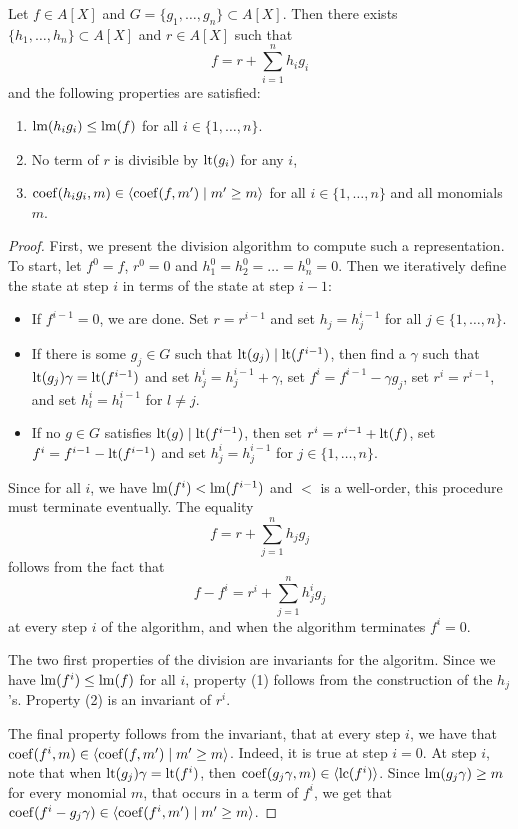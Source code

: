 \begin{theorem}
  Let $f \in A[X]$ and $G = \{g_{1}, \dots, g_{n}\} \subset A[X]$. Then there exists $\{h_{1}, \dots, h_{n}\} \subset A[X]$ and $r \in A[X]$ such that
  \[f = r + \sum_{i=1}^{n} h_{i} g_{i}\]
  and the following properties are satisfied:
  \begin{enumerate}
    \item $\operatorname{lm}(h_{i} g_{i}) \leq \operatorname{lm}(f)$ for all $i \in \{1, \dots, n\}$.
    \item No term of $r$ is divisible by $\operatorname{lt}(g_{i})$ for any $i$,
    \item $\operatorname{coef}(h_{i} g_{i}, m) \in \langle \operatorname{coef}(f, m') \mid m' \geq m \rangle$ for all $i \in \{1, \dots, n\}$ and all monomials $m$.
  \end{enumerate}
\end{theorem}
\begin{proof}
  First, we present the division algorithm to compute such a representation. To start, let $f^{0} = f$, $r^{0} = 0$ and $h_{1}^{0} = h_{2}^{0} = \dots = h_{n}^{0} = 0$. Then we iteratively define the state at step $i$ in terms of the state at step $i-1$:
  \begin{itemize}
    \item If $f^{i-1} = 0$, we are done. Set $r = r^{i-1}$ and set $h_{j} = h_{j}^{i-1}$ for all $j \in \{1, \dots, n\}$.
    \item If there is some $g_{j} \in G$ such that $\operatorname{lt}(g_{j}) \mid \operatorname{lt}(f^{i-1})$, then find a $\gamma$ such that $\operatorname{lt}(g_{j})\gamma = \operatorname{lt}(f^{i-1})$ and set $h_{j}^{i} = h_{j}^{i-1} + \gamma$, set $f^{i} = f^{i-1} - \gamma g_{j}$, set $r^{i} = r^{i-1}$, and set $h_{l}^{i} = h_{l}^{i-1}$ for $l \neq j$.
    \item If no $g \in G$ satisfies $\operatorname{lt}(g) \mid \operatorname{lt}(f^{i-1})$, then set $r^{i} = r^{i-1} + \operatorname{lt}(f)$, set $f^{i} = f^{i-1} - \operatorname{lt}(f^{i-1})$ and set $h_{j}^{i} = h_{j}^{i-1}$ for $j \in \{1, \dots, n\}$.
  \end{itemize}

  Since for all $i$, we have $\operatorname{lm}(f^{i}) < \operatorname{lm}(f^{i-1})$ and $<$ is a well-order, this procedure must terminate eventually. The equality
  \[f = r + \sum_{j=1}^{n} h_{j} g_{j}\] follows from the fact that
  \[f - f^{i} = r^{i} + \sum_{j=1}^{n} h^{i}_{j} g_{j}\]
  at every step $i$ of the algorithm, and when the algorithm terminates $f^{i} = 0$.

  The two first properties of the division are invariants for the algoritm. Since we have $\operatorname{lm}(f^{i}) \leq \operatorname{lm}(f)$ for all $i$, property (1) follows from the construction of the $h_{j}$'s. Property (2) is an invariant of $r^{i}$.

  The final property follows from the invariant, that at every step $i$, we have that $\operatorname{coef}(f^{i}, m) \in \langle \operatorname{coef}(f, m') \mid m' \geq m \rangle$. Indeed, it is true at step $i=0$. At step $i$, note that when $\operatorname{lt}(g_{j}) \gamma = \operatorname{lt}(f^{i})$, then $\operatorname{coef}(g_{j} \gamma, m) \in \langle \operatorname{lc}(f^{i}) \rangle$. Since $\operatorname{lm}(g_{j} \gamma) \geq m$ for every monomial $m$, that occurs in a term of $f^{i}$, we get that $\operatorname{coef}(f^{i} - g_{j} \gamma) \in \langle \operatorname{coef}(f^{i}, m') \mid m' \geq m \rangle$.
\end{proof}




